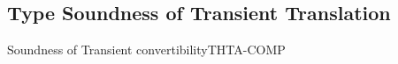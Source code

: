 \documentclass[acmlarge, anonymous, authordraft, review]{acmart} %
\begin{document}
\subsection*{Type Soundness of Transient Translation}

\begin{lemma}{Soundness of Transient convertibility}{THTA-COMP}
  \begin{conds}
    \cond{$\EnvTypeS\Env\K\e\t$}
    \cond{$\ep = \TRG{\e}\Env$}
    \cond{$\TR\K = \Kp$}
    \cond{$\TR\Env = \Envp$}
    \cond{$\EnvType\Envp\cdot\Kp{\ep}{\t}$}
  \end{conds}
  \then\axiom{$\EnvType\Envp\cdot\Kp{\TAG\e\Env{\tp}}{\kty\tp}$}


% 
% 
% 

\end{lemma}
\end{document}
